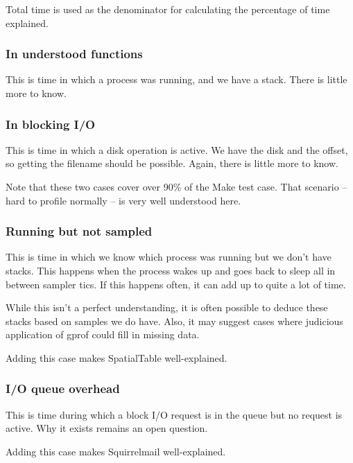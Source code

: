 \documentclass[10pt]{article}
\begin{document}
Total time is used as the denominator for calculating the percentage of time explained.

\subsubsection{In understood functions}

This is time in which a process was running, and we have a stack.  There is little more to know.

\subsubsection{In blocking I/O}

This is time in which a disk operation is active.  We have the disk and the offset, so getting the filename should be possible.  Again, there is little more to know.

Note that these two cases cover over 90\% of the Make test case.  That scenario -- hard to profile normally -- is very well understood here.

\subsubsection{Running but not sampled}

This is time in which we know which process was running but we don't have stacks.  This happens when the process wakes up and goes back to sleep all in between sampler tics.  If this happens often, it can add up to quite a lot of time.

While this isn't a perfect understanding, it is often possible to deduce these stacks based on samples we do have.  Also, it may suggest cases where judicious application of gprof could fill in missing data.

Adding this case makes SpatialTable well-explained.

\subsubsection{I/O queue overhead}

This is time during which a block I/O request is in the queue but no request is active.  Why it exists remains an open question.

Adding this case makes Squirrelmail well-explained.
\end{document}
